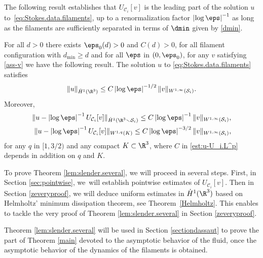 The following result establishes that $U_{\mathcal C_i}[v]$ is the leading part of the solution $u$ to~\eqref{eq:Stokes.data.filaments}, up to a renormalization factor
$\left|\log \eps\right|^{-1}$ as long as the filaments are sufficiently separated in terms of $\dmin$ given by \eqref{dmin}.
\begin{thm} \label{lem:slender.several}
For all $d> 0$ there exists $\eps_0(d)>0$ and $C(d)>0$, for all filament configuration with $d_{\min} \geq d$ and for all $\eps $ in $(0, \eps_0)$, for any $v$ satisfying \eqref{ass-v} we have the following result.
The solution $u$ to \eqref{eq:Stokes.data.filaments} satisfies
\begin{equation} \label{est:u_H^1}
\|u\|_{\dot H^1(\R^3)}
\leq C \left|\log \eps\right|^{-1/2} \|v\|_{W^{1,\infty} (\mathcal S_i)}.
\end{equation}
Moreover,
\begin{align} \label{est:u-U_i}
\|u - \left|\log \eps\right|^{-1} U_{\mathcal C_i}[v]\|_{\dot H^1(\R^3 \smallsetminus \mathcal S_i)}
\leq C \left|\log \eps\right|^{-1} \|v\|_{W^{1,\infty} (\mathcal S_i)}, \\ \label{est:u-U_i.L^p}
\|u - \left|\log \eps\right|^{-1} U_{\mathcal C_i}[v]\|_{W^{1,q}(K)}
\leq C \left|\log \eps\right|^{-3/2} \|v\|_{W^{1,\infty} (\mathcal S_i)},
\end{align}
for any $q$ in $[1, 3/2)$ and any compact $K \subset \R^3$, where $C$ in \eqref{est:u-U_i.L^p} depends in addition on $q$ and $K$.
\end{thm}
To prove Theorem \ref{lem:slender.several}, we will proceed in several steps.
First, in Section \ref{sec:pointwise}, we~will establish pointwise estimates of $U_{\mathcal C_i}[v]$.
Then in Section \ref{zeveryproof}, we will deduce uniform estimates in $\dot H^1(\R^3)$ based on Helmholtz' minimum dissipation theorem, see Theorem~\ref{Helmholtz}.
This enables to tackle the very proof of Theorem \ref{lem:slender.several} in Section \ref{zeveryproof}.

Theorem \ref{lem:slender.several} will be used in Section \ref{sectiondassaut} to prove the part of Theorem \ref{main} devoted to the asymptotic behavior of the fluid, once the asymptotic behavior of the dynamics of the filaments is obtained.


